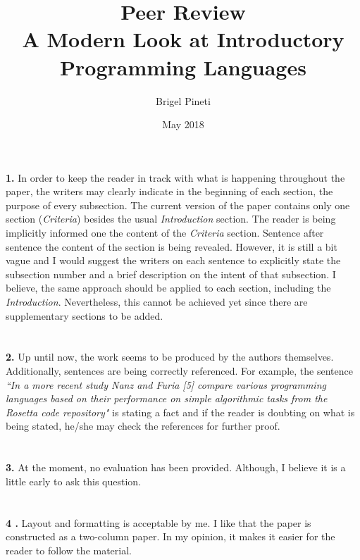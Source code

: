 \documentclass{article}
\title{\Large{Peer Review} \\
    \huge\textbf{{A Modern Look at Introductory Programming Languages}}}
\author{Brigel Pineti}
\date{May 2018}
\begin{document}
    
    \maketitle
    
    \section*{}
    \textbf{1. } In order to keep the reader in track with what is happening throughout the paper, the writers may clearly indicate in the beginning of each section, the purpose of every subsection. The current version of the paper contains only one section (\textit{Criteria}) besides the usual \textit{Introduction} section. The reader is being implicitly informed one the content of the \textit{Criteria} section. Sentence after sentence the content of the section is being revealed. However, it is still a bit vague and I would suggest the writers on each sentence to explicitly state the subsection number and a brief description on the intent of that subsection. I believe, the same approach should be applied to each section, including the \textit{Introduction}. Nevertheless, this cannot be achieved yet since there are supplementary sections to be added.  
    
    \section*{}
    \textbf{2. }  Up until now, the work seems to be produced by the authors themselves. Additionally, sentences are being correctly referenced. For example, the sentence \textit{``In a more recent study Nanz and Furia [5] compare various programming languages based on their performance on simple algorithmic tasks from the Rosetta code repository"} is stating a fact and if the reader is doubting on what is being stated, he/she may check the references for further proof.
    
    \section*{}
    \textbf{3. } At the moment, no evaluation has been provided. Although, I believe it is a little early to ask this question.
    
    \section*{}
    \textbf{4 .} Layout and formatting is acceptable by me. I like that the paper is constructed as a two-column paper. In my opinion, it makes it easier for the reader to follow the material.
    
\end{document}
